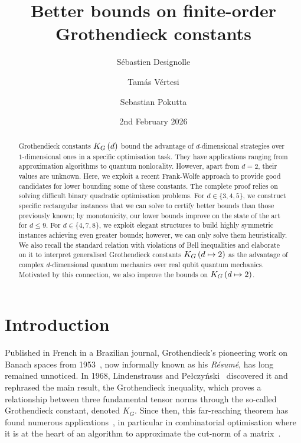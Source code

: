 \documentclass[10pt,aps,notitlepage,onecolumn,pra,superscriptaddress]{revtex4-1}
\newcommand\KG[2]{K_G\left({#1}\ifx#2\empty\else\mapsto\fi{#2}\right)}
\begin{document}
\author{Sébastien Designolle}
\author{Tamás Vértesi}
\author{Sebastian Pokutta}

\title{Better bounds on finite-order Grothendieck constants}
\date{2nd February 2026}

\begin{abstract}
  Grothendieck constants $\KG{d}{}$ bound the advantage of $d$-dimensional strategies over $1$-dimensional ones in a specific optimisation task.
  They have applications ranging from approximation algorithms to quantum nonlocality.
  However, apart from $d=2$, their values are unknown.
  Here, we exploit a recent Frank-Wolfe approach to provide good candidates for lower bounding some of these constants.
  The complete proof relies on solving difficult binary quadratic optimisation problems.
  For $d\in\{3,4,5\}$, we construct specific rectangular instances that we can solve to certify better bounds than those previously known; by monotonicity, our lower bounds improve on the state of the art for $d\leqslant9$.
  For $d\in\{4,7,8\}$, we exploit elegant structures to build highly symmetric instances achieving even greater bounds; however, we can only solve them heuristically.
  We also recall the standard relation with violations of Bell inequalities and elaborate on it to interpret generalised Grothendieck constants $\KG{d}{2}$ as the advantage of complex $d$-dimensional quantum mechanics over real qubit quantum mechanics.
  Motivated by this connection, we also improve the bounds on $\KG{d}{2}$.
\end{abstract}

\maketitle

\section{Introduction}

Published in French in a Brazilian journal, Grothendieck's pioneering work on Banach spaces from 1953~\cite{Gro53}, now informally known as his \emph{Résumé}, has long remained unnoticed.
In 1968, Lindenstrauss and Pe\l{}czy\'nski~\cite{LP68} discovered it and rephrased the main result, the Grothendieck inequality, which proves a relationship between three fundamental tensor norms through the so-called Grothendieck constant, denoted $K_G$.
Since then, this far-reaching theorem has found numerous applications~\cite{Pis11}, in particular in combinatorial optimisation where it is at the heart of an algorithm to approximate the cut-norm of a matrix~\cite{KN12}.
\end{document}
